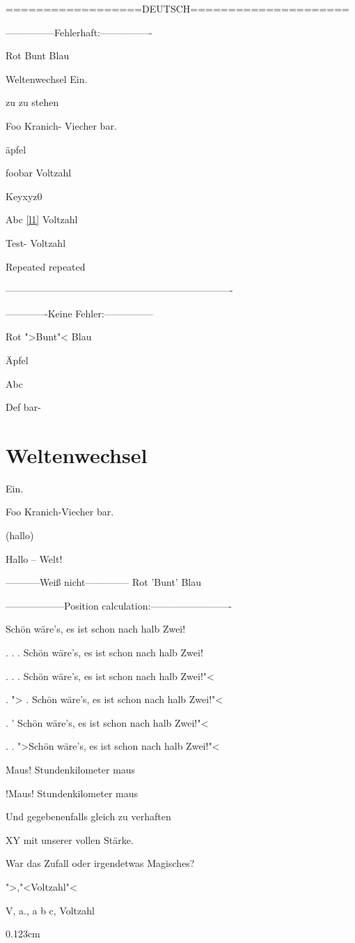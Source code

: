 
==================DEUTSCH=====================

---------------Fehlerhaft:----------------



Rot Bunt Blau


Weltenwechsel Ein.


zu zu stehen


Foo Kranich- Viecher bar. 


\"{a}pfel

\cite{keylist} foobar Voltzahl

Keyxyz0 \cite{keylist}

Abc \label{l1}\ref{l1}\label{l2} Voltzahl

Test-\label{key} Voltzahl


Repeated
repeated

----------------------------------------------------------------------

-------------Keine Fehler:---------------



Rot ">Bunt"< Blau


\"{A}pfel

Abc %

Def bar-%

\chapter{Weltenwechsel}
Ein.





Foo Kranich-Viecher bar. 


(hallo)

Hallo -- Welt!


-----------Weiß nicht--------------
Rot 'Bunt' Blau




------------------Position calculation:-------------------------

Schön wäre's, es ist schon nach halb Zwei!

. . . Schön wäre's, es ist schon nach halb Zwei! 

. . . Schön wäre's, es ist schon nach halb Zwei!"< 

. "> . Schön wäre's, es ist schon nach halb Zwei!"< 

. ' Schön wäre's, es ist schon nach halb Zwei!"< 

. . ">Schön wäre's, es ist schon nach halb Zwei!"< 


Maus! Stundenkilometer maus


!Maus! Stundenkilometer maus

Und gegebenenfalls gleich zu verhaften

XY mit unserer vollen Stärke.

War das Zufall oder irgendetwas Magisches?

      ">,"<Voltzahl"< 

V, a., a b c, Voltzahl

0.123cm